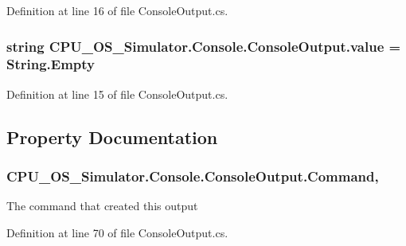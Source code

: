 Definition at line 16 of file Console\+Output.\+cs.

\hypertarget{class_c_p_u___o_s___simulator_1_1_console_1_1_console_output_a3bc577f947d51bc1b5c3880d5a7d5158}{}
\subsubsection[{value}]{\setlength{\rightskip}{0pt plus 5cm}string C\+P\+U\+\_\+\+O\+S\+\_\+\+Simulator.\+Console.\+Console\+Output.\+value = String.\+Empty\hspace{0.3cm}{\ttfamily [private]}}\label{class_c_p_u___o_s___simulator_1_1_console_1_1_console_output_a3bc577f947d51bc1b5c3880d5a7d5158}


Definition at line 15 of file Console\+Output.\+cs.



\subsection{Property Documentation}
\hypertarget{class_c_p_u___o_s___simulator_1_1_console_1_1_console_output_a15b8bc11762105b9b984135cf892a0b5}{}
\subsubsection[{Command}]{ C\+P\+U\+\_\+\+O\+S\+\_\+\+Simulator.\+Console.\+Console\+Output.\+Command\hspace{0.3cm}{\ttfamily [get]}, {\ttfamily [set]}}\label{class_c_p_u___o_s___simulator_1_1_console_1_1_console_output_a15b8bc11762105b9b984135cf892a0b5}


The command that created this output 



Definition at line 70 of file Console\+Output.\+cs.

